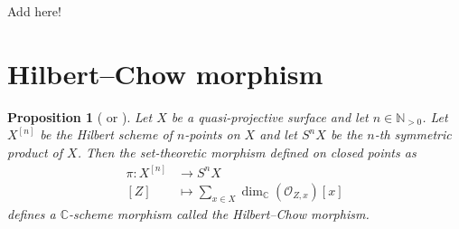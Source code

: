 \documentclass[12pt,a4paper]{amsart}
\theoremstyle{plain}
\newtheorem{prop}[thm]{Proposition}
\theoremstyle{definition}
\theoremstyle{remark}
\begin{document}
\color{red} Add \cite[Examples 3.5 and 3.6]{rot16} here! \color{black}

\section{Hilbert--Chow morphism}

\begin{prop}[{\cite[\S 3.2]{leh00} or \cite[p.~41]{ber08}}]
  Let $X$ be a quasi-projective surface and let $n \in \mathbb{N}_{>0}$.
  Let $X^{[n]}$ be the Hilbert scheme of $n$-points on $X$ and let $S^{n}X$ be the $n$-th symmetric product of $X$.
  Then the set-theoretic morphism defined on closed points as
  \begin{align*}
    \pi \colon X^{[n]} & \longrightarrow S^{n}X \\
    [Z] & \longmapsto \sum_{x \in X} \dim_{\mathbb{C}}(\mathscr{O}_{Z,x})[x] 
  \end{align*}
  defines a $\mathbb{C}$-scheme morphism called the \textit{Hilbert--Chow morphism}.
\end{prop}
\end{document}
